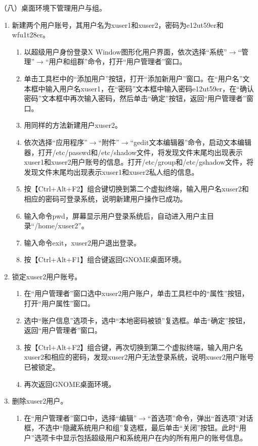 \vspace{0.1in}
（八）桌面环境下管理用户与组。
\begin{enumerate}
  \item 新建两个用户账号，其用户名为xuser1和xuser2，密码为e12ut59er和wfu1t28er。
    \begin{enumerate}
      \item 以超级用户身份登录X Window图形化用户界面，依次选择“系统”$\rightarrow$“管理”$\rightarrow$“用户和组群”命令，打开“用户管理者”窗口。
      \item 单击工具栏中的“添加用户”按钮，打开“添加新用户”窗口。在“用户名”文本框中输入用户名xuser1，在“密码”文本框中输入密码e12ut59er，在“确认密码”文本框中再次输入密码，然后单击“确定”按钮，返回“用户管理者”窗口。
      \item 用同样的方法新建用户xuser2。
      \item 依次选择“应用程序”$\rightarrow$“附件”$\rightarrow$“gedit文本编辑器”命令，启动文本编辑器，打开/etc/passwd和/etc/shadow文件，将发现文件末尾均出现表示xuser1和xuser2用户账号的信息。打开/etc/group和/etc/gshadow文件，将发现文件末尾均出现表示xuser1和xuser2私人组的信息。
      \item 按【Ctrl+Alt+F2】组合键切换到第二个虚拟终端，输入用户名xuser2和相应的密码可登录系统，说明新建用户操作已成功。
      \item 输入命令pwd，屏幕显示用户登录系统后，自动进入用户主目录“/home/xuser2”。
      \item 输入命令exit，xuser2用户退出登录。
      \item 按【Ctrl+Alt+F1】组合键返回GNOME桌面环境。
    \end{enumerate}
  \item 锁定xuser2用户账号。
    \begin{enumerate}
      \item 在“用户管理者”窗口选中xuser2用户账户，单击工具栏中的“属性”按钮，打开“用户属性”窗口。
      \item 选中“账户信息”选项卡，选中“本地密码被锁”复选框。单击“确定”按钮，返回“用户管理者”窗口。
      \item 按【Ctrl+Alt+F2】组合键，再次切换到第二个虚拟终端，输入用户名xuser2和相应的密码，发现xuser2用户无法登录系统，说明xuser2用户账号已被锁定。
      \item 再次返回GNOME桌面环境。
    \end{enumerate}
  \item 删除xuser2用户。
    \begin{enumerate}
      \item 在“用户管理者”窗口中，选择“编辑”$\rightarrow$“首选项”命令，弹出“首选项”对话框，不选中“隐藏系统用户和组”复选框，最后单击“关闭”按钮。此时“用户”选项卡中显示包括超级用户和系统用户在内的所有用户的账号信息。

\end{enumerate}
\end{enumerate}
